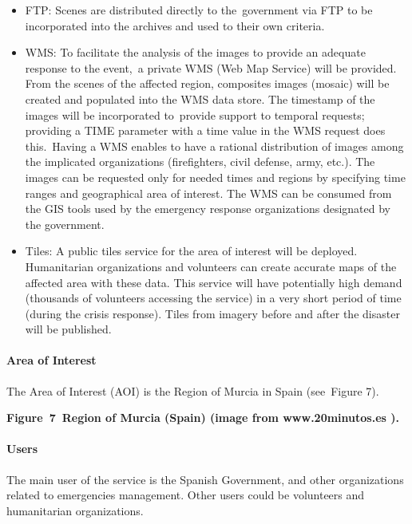 \documentclass[a4paper]{article}
\newcommand\liststyleLFOx{%
\renewcommand\labelitemi{[F0B7?]}
\renewcommand\labelitemii{o}
\renewcommand\labelitemiii{[F0A7?]}
\renewcommand\labelitemiv{[F0B7?]}
}
\begin{document}
\liststyleLFOx
\begin{itemize}
\item FTP: Scenes are distributed directly to the\ government via FTP to
be incorporated into the archives and used to their own criteria.
\item WMS: To facilitate the analysis of the images to provide an
adequate response to the event,\ a private WMS (Web Map Service) will
be provided. From the scenes of the affected region, composites images
(mosaic) will be created and populated into the WMS data store. The
timestamp of the images will be incorporated to\ provide support to
temporal requests; providing a TIME parameter with a time value in the
WMS request does this.\ Having a WMS enables to have a rational
distribution of images among the implicated organizations
(firefighters, civil defense, army, etc.). The images can be requested
only for needed times and regions by specifying time ranges and
geographical area of interest. The WMS can be consumed from the GIS
tools used by the emergency response organizations designated by the
government.
\item Tiles: A public tiles service for the area of interest will be
deployed. Humanitarian organizations and volunteers can create accurate
maps of the affected area with these data. This service will have
potentially high demand (thousands of volunteers accessing the service)
in a very short period of time (during the crisis response). Tiles from
imagery before and after the disaster will be published.
\end{itemize}
\paragraph[Area of Interest\ ]{ Area of
Interest\ }
\foreignlanguage{english}{The Area of Interest (AOI) is the Region of
Murcia in Spain (see\ }Figure 7\foreignlanguage{english}{).\ }

{%
 \par}

{\centering\bfseries
\label{bkm:Ref377543478}Figure\ 7\ Region of Murcia (Spain) (image from
www.20minutos.es ).
\par}


\bigskip

\paragraph[Users]{ Users}
{
The main user of the service is the Spanish Government, and other
organizations related to emergencies management. Other users could be
volunteers and humanitarian organizations.}
\end{document}
